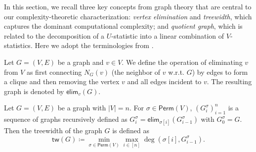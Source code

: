 \documentclass[letterpaper,11pt]{article}
\newcommand{\sPi}{\pi}
\newcommand{\sper}{\sigma}
\newcommand{\perm}[1]{\mathsf{Perm}(#1)}
\newcommand{\partition}{\Pi}
\newcommand{\partitionp}[1]{\partition_{#1}}
\newcommand{\degp}[2]{\deg(#1,#2)}
\newcommand{\neighborvg}[2]{N_{#2}(#1)}
\newcommand{\treewidthp}[1]{\mathsf{tw}(#1)}
\newcommand{\eliminatevg}[2]{\mathsf{elim}_{#1}(#2)}
\begin{document}
\begin{bibunit}[plainnat]

In this section, we recall three key concepts from graph theory that are central to our complexity-theoretic characterization: \emph{vertex elimination} 
and \emph{treewidth}, which captures the dominant computational complexity; and \emph{quotient graph}, which is related to the decomposition of a $U$-statistic into a linear combination of $V$-statistics. Here we adopt the terminologies from \citet{bodlaender2010treewidth}.

\begin{definition}
\label{def:vertex_elimination}
Let $G = (V, E)$ be a graph and $v \in V$. We define the operation of eliminating $v$ from $V$ as first connecting $\neighborvg{v}{G}$ (the neighbor of $v$ w.r.t. $G$) by edges to form a clique and then removing the vertex $v$ and all edges incident to $v$. The resulting graph is denoted by $\eliminatevg{v}{G}$. 
\end{definition}

\begin{definition}[Treewidth]
\label{def:treewidth_elimination}
Let $G = (V, E)$ be a graph with $|V| = n$. For $\sigma \in \perm{V}$, $(G_i^{\sigma})_{i=1}^n$ is a sequence of graphs recursively defined as $G_i^\sigma = \eliminatevg{\sigma[i]}{G_{i-1}^\sigma}$ with $G_0^\sigma = G$. Then the treewidth of the graph $G$ is defined as 
\begin{equation*}
\treewidthp{G} \coloneqq \min_{\sigma \in \perm{V}} \max_{i \in [n]} \degp{\sper[i]}{G_{i-1}^\sigma}. 
\end{equation*}
\end{definition}


\end{bibunit}
\end{document}
